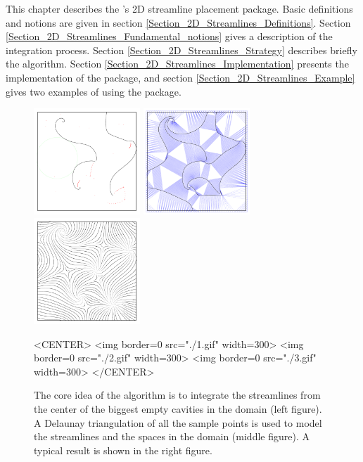 \newcommand{\streamlinecomment}[1]{}

This chapter describes the \cgal's 2D streamline placement package.
Basic definitions and notions are given in section \ref{Section_2D_Streamlines_Definitions}.
Section \ref{Section_2D_Streamlines_Fundamental_notions} gives a description of the integration process.
Section \ref{Section_2D_Streamlines_Strategy} describes briefly the algorithm.
Section \ref{Section_2D_Streamlines_Implementation} presents the implementation of the package, and
section \ref{Section_2D_Streamlines_Example} gives two examples of using the package.

\begin{figure}[h!]
\begin{ccTexOnly}
\begin{center}
\includegraphics[width=4cm]{Stream_lines_2/1} \hspace*{0.5cm} 
\includegraphics[width=4cm]{Stream_lines_2/2} \hspace*{0.5cm} 
\includegraphics[width=4cm]{Stream_lines_2/3}
\end{center}
\end{ccTexOnly}
\caption{The core idea of the algorithm is to integrate the streamlines from the center of the biggest empty cavities in the domain (left figure). A Delaunay triangulation of all the sample points is used to model the streamlines and the spaces in the domain (middle figure). A typical result is shown in the right figure.}
\label{illustration}
\begin{ccHtmlOnly}
<CENTER>
<img border=0 src="./1.gif" width=300>
<img border=0 src="./2.gif" width=300>
<img border=0 src="./3.gif" width=300>
</CENTER>
\end{ccHtmlOnly}
\end{figure}

